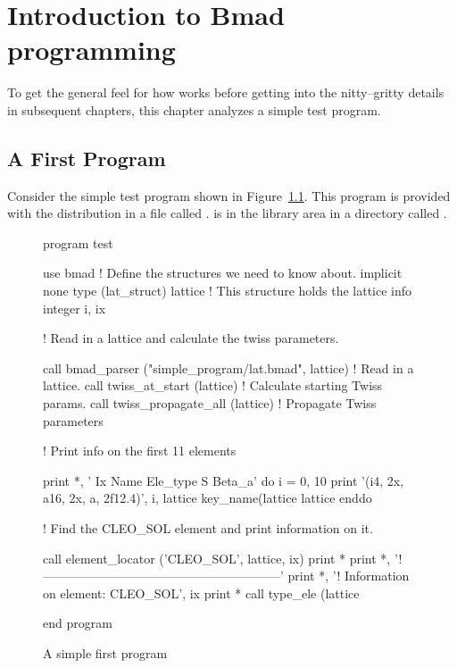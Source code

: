 \chapter{Introduction to Bmad programming}
\label{c:program.info}

To get the general feel for how \bmad works before
getting into the nitty--gritty details in subsequent chapters, this
chapter analyzes a simple test program.

\section{A First Program}

Consider the simple test program shown in Figure~\ref{f:program}.
This program is provided with the \bmad distribution in a file called
.  is in the 
library area in a directory called .

\begin{figure}[ht]
\begin{listing}{1}
program test

  use bmad                 ! Define the structures we need to know about.
  implicit none
  type (lat_struct) lattice  ! This structure holds the lattice info
  integer i, ix

! Read in a lattice and calculate the twiss parameters.

  call bmad_parser ("simple_program/lat.bmad", lattice) ! Read in a lattice.
  call twiss_at_start (lattice)           ! Calculate starting Twiss params.
  call twiss_propagate_all (lattice)      ! Propagate Twiss parameters

! Print info on the first 11 elements

  print *, ' Ix  Name              Ele_type                   S      Beta_a'
  do i = 0, 10
    print '(i4, 2x, a16, 2x, a, 2f12.4)', i, lattice%
                    key_name(lattice%
                    lattice%
  enddo

! Find the CLEO_SOL element and print information on it.

  call element_locator ('CLEO_SOL', lattice, ix)
  print *
  print *, '!---------------------------------------------------------'
  print *, '! Information on element: CLEO_SOL', ix
  print *
  call type_ele (lattice%

end program
\end{listing}
\caption{A simple first program}
\label{f:program}
\end{figure}


